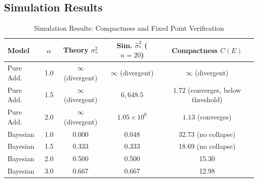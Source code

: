 \documentclass[12pt,a4paper]{article}
\theoremstyle{definition}
\begin{document}
\subsection{Simulation Results}

\begin{table}[htbp]
\centering
\caption{Simulation Results: Compactness and Fixed Point Verification}
\label{tab:sim_results}
\begin{tabular}{@{}lcccc@{}}
\toprule
\textbf{Model} & $\alpha$ & \textbf{Theory $\sigma_*^2$} & \textbf{Sim. $\hat{\sigma}_*^2$ ($n{=}20$)} & \textbf{Compactness $C(E)$} \\
\midrule
Pure Add. & 1.0 & $\infty$ (divergent) & $\infty$ (divergent) & $\infty$ (divergent) \\
Pure Add. & 1.5 & $\infty$ (divergent) & $6{,}648.5$ & $1.72$ (converges, below threshold) \\
Pure Add. & 2.0 & $\infty$ (divergent) & $1.05{\times}10^6$ & $1.13$ (converges) \\
Bayesian  & 1.0 & 0.000 & 0.048 & 32.73 (no collapse) \\
Bayesian  & 1.5 & 0.333 & 0.333 & 18.69 (no collapse) \\
Bayesian  & 2.0 & 0.500 & 0.500 & 15.30 \\
Bayesian  & 3.0 & 0.667 & 0.667 & 12.98 \\
\bottomrule
\end{tabular}
\end{table}
\end{document}
